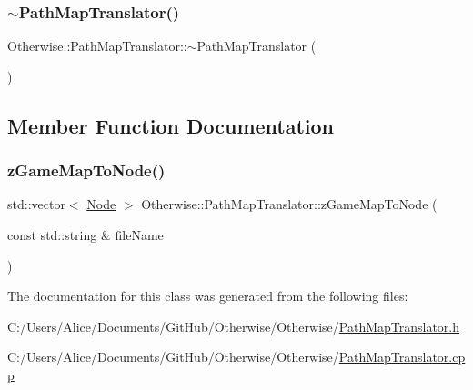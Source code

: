 \mbox{\label{class_otherwise_1_1_path_map_translator_abeed95c7c0eae43710a962b745417661}} 
\subsubsection{\texorpdfstring{$\sim$\+Path\+Map\+Translator()}{~PathMapTranslator()}}
{\footnotesize\ttfamily Otherwise\+::\+Path\+Map\+Translator\+::$\sim$\+Path\+Map\+Translator (\begin{DoxyParamCaption}{ }\end{DoxyParamCaption})}



\subsection{Member Function Documentation}
\mbox{\label{class_otherwise_1_1_path_map_translator_af6f55821ee2e71d730209b739c858b32}} 
\subsubsection{\texorpdfstring{z\+Game\+Map\+To\+Node()}{zGameMapToNode()}}
{\footnotesize\ttfamily std\+::vector$<$ \hyperlink{struct_otherwise_1_1_node}{Node} $>$ Otherwise\+::\+Path\+Map\+Translator\+::z\+Game\+Map\+To\+Node (\begin{DoxyParamCaption}\item[{const std\+::string \&}]{file\+Name }\end{DoxyParamCaption})}



The documentation for this class was generated from the following files\+:\begin{DoxyCompactItemize}
\item 
C\+:/\+Users/\+Alice/\+Documents/\+Git\+Hub/\+Otherwise/\+Otherwise/\hyperlink{_path_map_translator_8h}{Path\+Map\+Translator.\+h}\item 
C\+:/\+Users/\+Alice/\+Documents/\+Git\+Hub/\+Otherwise/\+Otherwise/\hyperlink{_path_map_translator_8cpp}{Path\+Map\+Translator.\+cpp}\end{DoxyCompactItemize}
